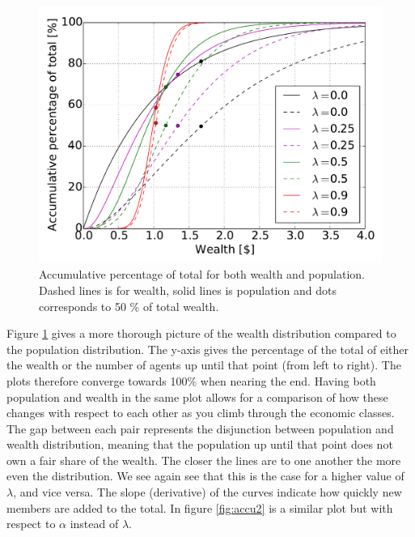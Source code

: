 \begin{figure}[H]
    \centering
    \includegraphics[width = 0.7\linewidth]{result/5c-accu-persons-accu-money}
    \caption{Accumulative percentage of total for both wealth and population. Dashed lines is for wealth, solid lines is population and dots corresponds to 50 \% of total wealth.}
    \label{fig:accu1}
\end{figure}

Figure \ref{fig:accu1} gives a more thorough picture of the wealth distribution compared to the population distribution. The y-axis gives the percentage of the total of either the wealth or the number of agents up until that point (from left to right). The plots therefore converge towards 100\% when nearing the end. Having both population and wealth in the same plot allows for a comparison of how these changes with respect to each other as you climb through the economic classes. The gap between each pair represents the disjunction between population and wealth distribution, meaning that the population up until that point does not own a fair share of the wealth. The closer the lines are to one another the more even the distribution. We see again see that this is the case for a higher value of $\lambda$, and vice versa. The slope (derivative) of the curves indicate how quickly new members are added to the total. In figure \ref{fig:accu2} is a similar plot but with respect to $\alpha$ instead of $\lambda$.\\

